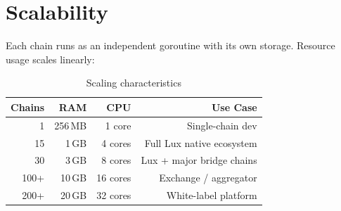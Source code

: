 \section{Scalability}


Each chain runs as an independent goroutine with its own storage. Resource usage scales
linearly:

\begin{table}[H]
\centering
\begin{tabular}{rrrr}
\toprule
\textbf{Chains} & \textbf{RAM} & \textbf{CPU} & \textbf{Use Case} \\
\midrule
1 & 256\,MB & 1 core & Single-chain dev \\
15 & 1\,GB & 4 cores & Full Lux native ecosystem \\
30 & 3\,GB & 8 cores & Lux + major bridge chains \\
100+ & 10\,GB & 16 cores & Exchange / aggregator \\
200+ & 20\,GB & 32 cores & White-label platform \\
\bottomrule
\end{tabular}
\caption{Scaling characteristics}
\end{table}


